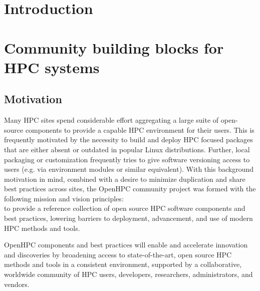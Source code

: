 \documentclass{sig-alternate-05-2015}
\begin{document}

%
%

%
%
\printccsdesc


\section{Introduction}


\section{Community building blocks for HPC systems}

\subsection{Motivation}
Many HPC sites spend considerable effort aggregating a large suite of
open-source components to provide a capable HPC environment for their users.
This is frequently motivated by the necessity to build and deploy HPC focused
packages that are either absent or outdated in popular Linux
distributions. Further, local packaging or customization frequently tries to
give software versioning access to users (e.g. via environment modules or
similar equivalent).  With this background motivation in mind, combined with a
desire to minimize duplication and share best practices across sites, the OpenHPC community
project was formed with the following mission and vision principles: \\

 to 
provide a reference collection of open source HPC software components and
best practices, lowering barriers to deployment, advancement, and use of
modern HPC methods and tools.

 OpenHPC components and best practices will enable and
accelerate innovation and discoveries by broadening access to state-of-the-art,
open source HPC methods and tools in a consistent environment, supported by a
collaborative, worldwide community of HPC users, developers, researchers,
administrators, and vendors. \\
\end{document}
